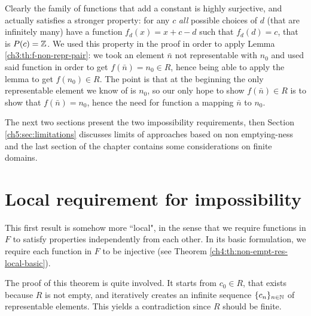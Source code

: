 Clearly the family of functions that add a constant is highly surjective, and actually satisfies a stronger property: for any $c$ \textit{all} possible choices of $d$ (that are infinitely many) have a function $f_d(x) = x + c - d$ such that $f_d(d) = c$, that is $P(c) = \mathbb{Z}$. We used this property in the proof in order to apply Lemma \ref{ch3:th:f-non-repr-pair}: we took an element $\bar{n}$ not representable with $n_0$ and used said function in order to get $f(\bar{n}) = n_0 \in R$, hence being able to apply the lemma to get $f(n_0) \in R$. The point is that at the beginning the only representable element we know of is $n_0$, so our only hope to show $f(\bar{n}) \in R$ is to show that $f(\bar{n}) = n_0$, hence the need for function a mapping $\bar{n}$ to $n_0$.

The next two sections present the two impossibility requirements, then Section \ref{ch5:sec:limitations} discusses limits of approaches based on non emptying-ness and the last section of the chapter contains some considerations on finite domains.

\section{Local requirement for impossibility}
This first result is somehow more ``local", in the sense that we require functions in $F$ to satisfy properties independently from each other. In its basic formulation, we require each function in $F$ to be injective (see Theorem \ref{ch4:th:non-empt-res-local-basic}).

The proof of this theorem is quite involved. It starts from $c_0 \in R$, that exists because $R$ is not empty, and iteratively creates an infinite sequence $\{ c_n \}_{n \in \mathbb{N}}$ of representable elements. This yields a contradiction since $R$ should be finite.

